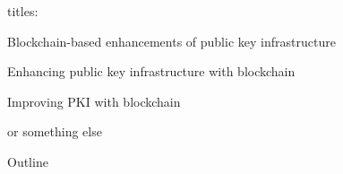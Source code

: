 \documentclass[11pt]{beamer}
\begin{document}
\begin{frame}
titles:

Blockchain-based enhancements of public key infrastructure

Enhancing public key infrastructure with blockchain

Improving PKI with blockchain

or something else
\end{frame}

\begin{frame}{Outline}
\tableofcontents
\end{frame}








\end{document}
